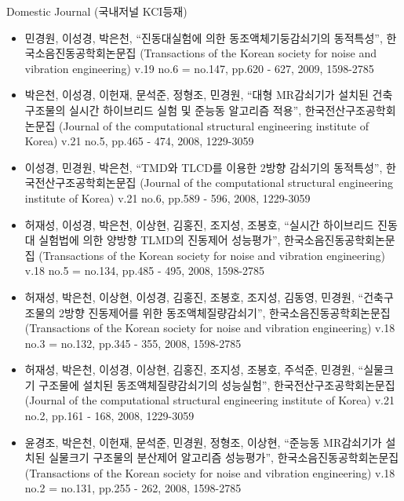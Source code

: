 \documentclass[usepdftitle=false]{beamer}
\newcommand\Fontvi{\fontsize{6}{7.2}\selectfont}
\begin{document}
\begin{frame}{Domestic Journal (국내저널 KCI등재)}
\Fontvi
\begin{itemize}
\item 민경원, 이성경, 박은천, “진동대실험에 의한 동조액체기둥감쇠기의 동적특성”, 한국소음진동공학회논문집 (Transactions of the Korean society for noise and vibration engineering) v.19 no.6 = no.147, pp.620 - 627, 2009, 1598-2785
\item 박은천, 이성경, 이헌재, 문석준, 정형조, 민경원, “대형 MR감쇠기가 설치된 건축구조물의 실시간 하이브리드 실험 및 준능동 알고리즘 적용”, 한국전산구조공학회논문집 (Journal of the computational structural engineering institute of Korea) v.21 no.5, pp.465 - 474, 2008, 1229-3059
\item 이성경, 민경원, 박은천, “TMD와 TLCD를 이용한 2방향 감쇠기의 동적특성”, 한국전산구조공학회논문집 (Journal of the computational structural engineering institute of Korea) v.21 no.6, pp.589 - 596, 2008, 1229-3059
\item 허재성, 이성경, 박은천, 이상현, 김홍진, 조지성, 조봉호, “실시간 하이브리드 진동대 실험법에 의한 양방향 TLMD의 진동제어 성능평가”, 한국소음진동공학회논문집 (Transactions of the Korean society for noise and vibration engineering) v.18 no.5 = no.134, pp.485 - 495, 2008, 1598-2785
\item 허재성, 박은천, 이상현, 이성경, 김홍진, 조봉호, 조지성, 김동영, 민경원, “건축구조물의 2방향 진동제어를 위한 동조액체질량감쇠기”, 한국소음진동공학회논문집 (Transactions of the Korean society for noise and vibration engineering) v.18 no.3 = no.132, pp.345 - 355, 2008, 1598-2785
\item 허재성, 박은천, 이성경, 이상현, 김홍진, 조지성, 조봉호, 주석준, 민경원, “실물크기 구조물에 설치된 동조액체질량감쇠기의 성능실험”, 한국전산구조공학회논문집 (Journal of the computational structural engineering institute of Korea) v.21 no.2, pp.161 - 168, 2008, 1229-3059
\item 윤경조, 박은천, 이헌재, 문석준, 민경원, 정형조, 이상현, “준능동 MR감쇠기가 설치된 실물크기 구조물의 분산제어 알고리즘 성능평가”, 한국소음진동공학회논문집 (Transactions of the Korean society for noise and vibration engineering) v.18 no.2 = no.131, pp.255 - 262, 2008, 1598-2785
\end{itemize}
\end{frame}
\end{document}

